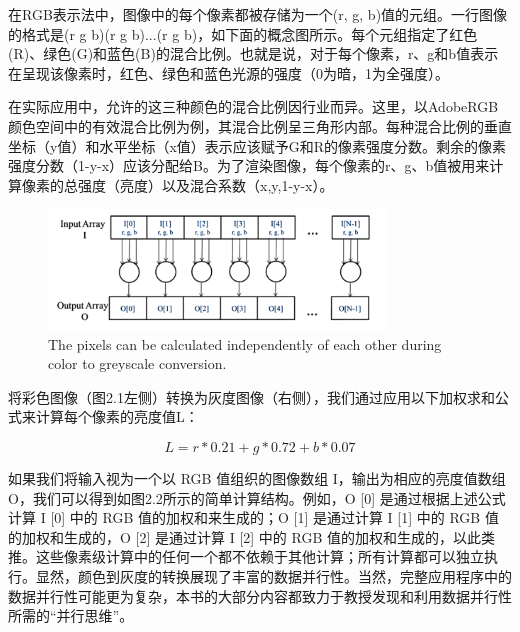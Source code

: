 \documentclass[11pt]{ctexart}
\begin{document}
在RGB表示法中，图像中的每个像素都被存储为一个(r, g, b)值的元组。一行图像的格式是(r g b)(r g b)...(r g b)，如下面的概念图所示。每个元组指定了红色(R)、绿色(G)和蓝色(B)的混合比例。也就是说，对于每个像素，r、g和b值表示在呈现该像素时，红色、绿色和蓝色光源的强度（0为暗，1为全强度）。

在实际应用中，允许的这三种颜色的混合比例因行业而异。这里，以AdobeRGB颜色空间中的有效混合比例为例，其混合比例呈三角形内部。每种混合比例的垂直坐标（y值）和水平坐标（x值）表示应该赋予G和R的像素强度分数。剩余的像素强度分数（1-y-x）应该分配给B。为了渲染图像，每个像素的r、g、b值被用来计算像素的总强度（亮度）以及混合系数（x,y,1-y-x）。

\begin{figure}[ht]
	\centering
	\includegraphics[width=0.8\textwidth]{photos/pixels.png}
	\caption{The pixels can be calculated independently of each other during color to greyscale
		conversion.}
	\label{fig:2}
\end{figure}

将彩色图像（图2.1左侧）转换为灰度图像（右侧），我们通过应用以下加权求和公式来计算每个像素的亮度值L：

\begin{equation}
	L= r*0.21 + g * 0.72 + b *0.07
\end{equation}

如果我们将输入视为一个以 RGB 值组织的图像数组 I，输出为相应的亮度值数组 O，我们可以得到如图2.2所示的简单计算结构。例如，O [0] 是通过根据上述公式计算 I [0] 中的 RGB 值的加权和来生成的；O [1] 是通过计算 I [1] 中的 RGB 值的加权和生成的，O [2] 是通过计算 I [2] 中的 RGB 值的加权和生成的，以此类推。这些像素级计算中的任何一个都不依赖于其他计算；所有计算都可以独立执行。显然，颜色到灰度的转换展现了丰富的数据并行性。当然，完整应用程序中的数据并行性可能更为复杂，本书的大部分内容都致力于教授发现和利用数据并行性所需的“并行思维”。
\end{document}
